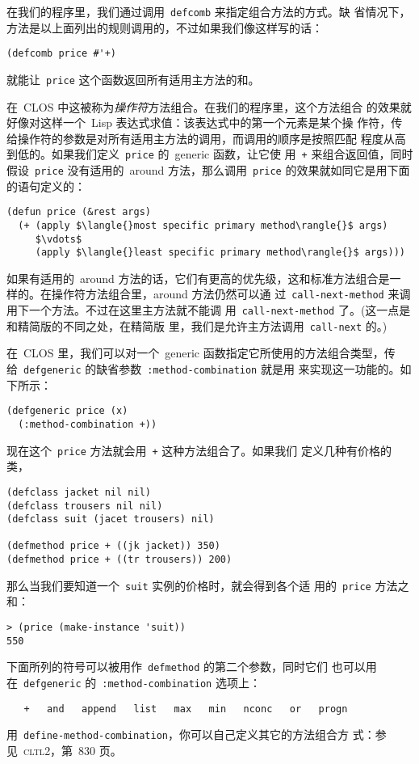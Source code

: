 在我们的程序里，我们通过调用~\texttt{defcomb} 来指定组合方法的方式。缺
省情况下，方法是以上面列出的规则调用的，不过如果我们像这样写的话：
\begin{lstlisting}
(defcomb price #'+)
\end{lstlisting}
就能让~\texttt{price} 这个函数返回所有适用主方法的和。

在~CLOS 中这被称为\emph{操作符}方法组合。在我们的程序里，这个方法组合
的效果就好像对这样一个~Lisp 表达式求值：该表达式中的第一个元素是某个操
作符，传给操作符的参数是对所有适用主方法的调用，而调用的顺序是按照匹配
程度从高到低的。如果我们定义~\texttt{price} 的~generic 函数，让它使
用~\texttt{+} 来组合返回值，同时假设~\texttt{price} 没有适用的~around
方法，那么调用~\texttt{price} 的效果就如同它是用下面的语句定义的：
\begin{lstlisting}
(defun price (&rest args)
  (+ (apply $\langle{}most specific primary method\rangle{}$ args)
     $\vdots$
     (apply $\langle{}least specific primary method\rangle{}$ args)))
\end{lstlisting}
如果有适用的~around 方法的话，它们有更高的优先级，这和标准方法组合是一
样的。在操作符方法组合里，around 方法仍然可以通
过~\texttt{call-next-method} 来调用下一个方法。不过在这里主方法就不能调
用~\texttt{call-next-method} 了。(这一点是和精简版的不同之处，在精简版
里，我们是允许主方法调用~\texttt{call-next} 的。)

在~CLOS 里，我们可以对一个~generic 函数指定它所使用的方法组合类型，传
给~\texttt{defgeneric} 的缺省参数~\texttt{:method-combination} 就是用
来实现这一功能的。如下所示：
\begin{lstlisting}
(defgeneric price (x)
  (:method-combination +))
\end{lstlisting}
现在这个~\texttt{price} 方法就会用~\texttt{+} 这种方法组合了。如果我们
定义几种有价格的类，
\begin{lstlisting}
(defclass jacket nil nil)
(defclass trousers nil nil)
(defclass suit (jacet trousers) nil)

(defmethod price + ((jk jacket)) 350)
(defmethod price + ((tr trousers)) 200)
\end{lstlisting}
那么当我们要知道一个~\texttt{suit} 实例的价格时，就会得到各个适
用的~\texttt{price} 方法之和：
\begin{lstlisting}
> (price (make-instance 'suit))
550
\end{lstlisting}
下面所列的符号可以被用作~\texttt{defmethod} 的第二个参数，同时它们
也可以用在~\texttt{defgeneric} 的~\texttt{:method-combination} 
选项上：
\begin{lstlisting}
   +   and   append   list   max   min   nconc   or   progn
\end{lstlisting}
用~\texttt{define-method-combination}，你可以自己定义其它的方法组合方
式：参见~\textsc{cltl}2，第~830 页。


